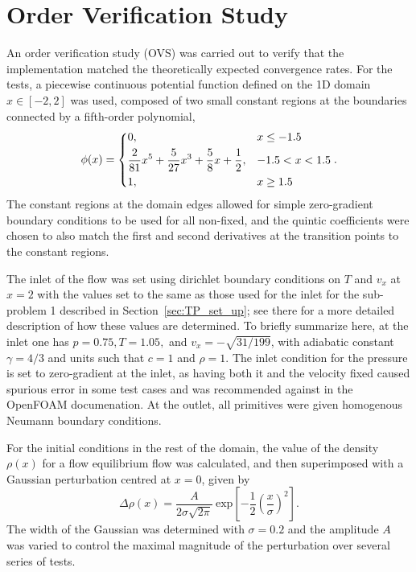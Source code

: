 \section{Order Verification Study}
\label{sec:OVS}

An order verification study (OVS) was carried out to verify that the implementation matched the theoretically expected convergence rates. For the tests, a piecewise continuous potential function defined on the 1D domain $x\in[-2,2]$ was used, composed of two small constant regions at the boundaries connected by a fifth-order polynomial,
\begin{equation}
\phi(x)=
\begin{dcases} 
      0, & x\leq -1.5 \\
      \frac{2}{81}x^5+\frac{5}{27}x^3+\frac{5}{8}x+\frac{1}{2}, & -1.5<x<1.5 \\
      1, & x\geq 1.5
\end{dcases}.
\end{equation}
The constant regions at the domain edges allowed for simple zero-gradient boundary conditions to be used for all non-fixed, and the quintic coefficients were chosen to also match the first and second derivatives at the transition points to the constant regions.

The inlet of the flow was set using dirichlet boundary conditions on $T$ and $v_x$ at $x=2$ with the values set to the same as those used for the inlet for the sub-problem 1 described in Section~\ref{sec:TP_set_up}; see there for a more detailed description of how these values are determined. To briefly summarize here, at the inlet one has $p=0.75, T=1.05,$ and $v_x=-\sqrt{31/199}$, with adiabatic constant $\gamma=4/3$ and units such that $c=1$ and $\rho=1$. The inlet condition for the pressure is set to zero-gradient at the inlet, as having both it and the velocity fixed caused spurious error in some test cases and was recommended against in the OpenFOAM documenation. At the outlet, all primitives were given homogenous Neumann boundary conditions.

For the initial conditions in the rest of the domain, the value of the density $\rho(x)$ for a flow equilibrium flow was calculated, and then superimposed with a Gaussian perturbation centred at $x=0$, given by
\begin{equation}
\Delta \rho(x)=\frac{A}{2\sigma \sqrt{2 \pi}}\ \textrm{exp}\left[-\frac{1}{2}\left(\frac{x}{\sigma}\right)^2\right].
\end{equation}
The width of the Gaussian was determined with $\sigma=0.2$ and the amplitude $A$ was varied to control the maximal magnitude of the perturbation over several series of tests.

